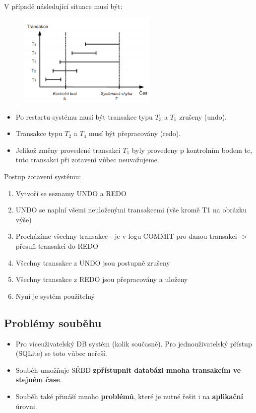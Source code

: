 \noindent V případě následující situace musí být:
\begin{figure}[H]
\centering
\includegraphics[width=0.6\textwidth]{assets/kontrolni_body.png}
\end{figure}

\begin{itemize}
\item Po restartu systému musí být transakce typu $ T_3 $ a $ T_5 $ zrušeny (undo).
\item Transakce typu $T_2$ a $T_4$ musí být přepracovány (redo).
\item Jelikož změny provedené transakcí $ T_1 $ byly provedeny p kontrolním bodem tc, tuto transakci při zotavení vůbec neuvažujeme.
\end{itemize}

Postup zotavení systému:
\begin{enumerate}
	\item Vytvoří se seznamy UNDO a REDO
	\item UNDO se naplní všemi neuloženými transakcemi (vše kromě T1 na obrázku výše)
	\item Procházíme všechny transakce - je v logu COMMIT pro danou transakci -> přesuň transakci do REDO
	\item Všechny transakce z UNDO jsou postupně zrušeny
	\item Všechny transakce z REDO jsou přepracovány a uloženy
	\item Nyní je systém použitelný
\end{enumerate}

\subsection{Problémy souběhu}
\begin{itemize}
\item Pro víceuživatelský DB systém (kolik současně). Pro jednouživatelský přístup (SQLite) se toto vůbec neřeší.
\item Souběh umožňuje SŘBD \textbf{zpřístupnit databázi mnoha transakcím ve stejném čase}.
\item Souběh také přináší mnoho \textbf{problémů}, které je nutné řešit i na \textbf{aplikační} úrovni.
\end{itemize}

